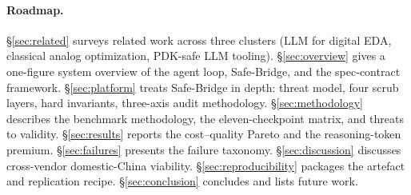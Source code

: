 \paragraph{Roadmap.}
\S\ref{sec:related} surveys related work across three clusters
(LLM for digital EDA, classical analog optimization, PDK-safe LLM
tooling). \S\ref{sec:overview} gives a one-figure system overview
of the agent loop, Safe-Bridge, and the spec-contract framework.
\S\ref{sec:platform} treats Safe-Bridge in depth: threat model,
four scrub layers, hard invariants, three-axis audit methodology.
\S\ref{sec:methodology} describes the benchmark methodology, the
eleven-checkpoint matrix, and threats to validity.
\S\ref{sec:results} reports the cost--quality Pareto and the
reasoning-token premium. \S\ref{sec:failures} presents the failure
taxonomy. \S\ref{sec:discussion} discusses cross-vendor
domestic-China viability. \S\ref{sec:reproducibility} packages the
artefact and replication recipe. \S\ref{sec:conclusion} concludes
and lists future work.
